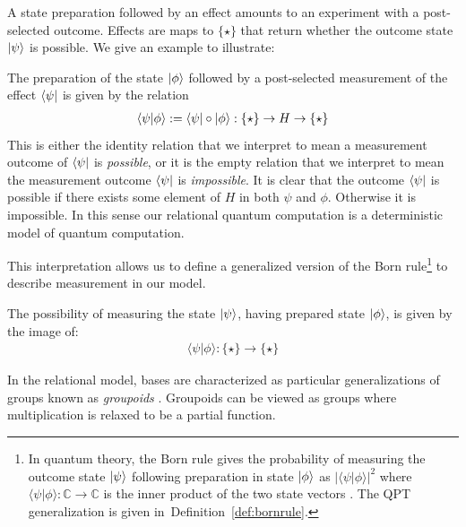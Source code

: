 \noindent A state preparation followed by an effect amounts to an experiment with a post-selected outcome. Effects are maps to $\{\star\}$ that return whether the outcome state $| \psi \rangle$ is possible.
 We give an example to illustrate:
\begin{example}
The preparation of the state $| \phi \rangle$ followed by a post-selected measurement of the effect $\langle \psi |$ is given by the relation
\begin{align*}
\langle\psi|\phi\rangle:=\langle \psi |\circ| \phi \rangle:\{\star\}\to H\to \{\star\}
\end{align*}
This is either the identity relation that we interpret to mean a measurement outcome of $\langle \psi |$ is \emph{possible}, or it is the empty relation that we interpret to mean the measurement outcome $\langle \psi |$ is \emph{impossible}. It is clear that the outcome $\langle \psi |$ is possible if there exists some element of $H$ in both $\psi$ and $\phi$. Otherwise it is impossible.
In this sense our relational quantum computation is a deterministic model of quantum computation.
\end{example}

This interpretation allows us to define a generalized version of the Born rule\footnote{In quantum theory, the Born rule gives the probability of measuring the outcome state $| \psi \rangle$ following preparation in state $| \phi \rangle$ as $|\langle\psi|\phi\rangle|^2$ where $\langle\psi|\phi\rangle:\mathbb{C}\to\mathbb{C}$ is the inner product of the two state vectors \cite{nielsen2010quantum}. The QPT generalization is given in\ Definition~\ref{def:bornrule}.} to describe measurement in our model.
\begin{axiom}
\label{ax:relborn}
The possibility of measuring the state $| \psi \rangle$, having prepared state $| \phi \rangle$, is given by the image of:
\begin{align}
\langle\psi|\phi\rangle:\{\star\}\to\{\star\}
\end{align}
\end{axiom}

In the relational model, bases are characterized as particular generalizations of groups known as \textit{groupoids} \cite{cqm-notes,pavlovic2009quantum}.  Groupoids can be viewed as groups where multiplication is relaxed to be a partial function.

